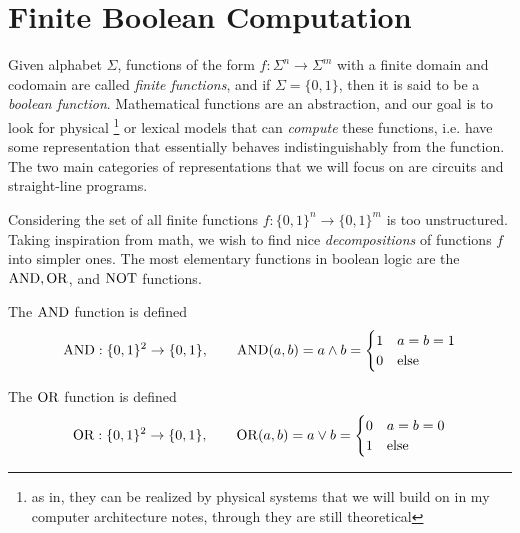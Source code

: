 \section{Finite Boolean Computation}

  Given alphabet $\Sigma$, functions of the form $f: \Sigma^n \to \Sigma^m$ with a finite domain and codomain are called \textit{finite functions}, and if $\Sigma = \{0, 1\}$, then it is said to be a \textit{boolean function}. Mathematical functions are an abstraction, and our goal is to look for physical \footnote{as in, they can be realized by physical systems that we will build on in my computer architecture notes, through they are still theoretical} or lexical models that can \textit{compute} these functions, i.e. have some representation that essentially behaves indistinguishably from the function. The two main categories of representations that we will focus on are circuits and straight-line programs. 

  \label{binary_motivation}
  Considering the set of all finite functions $f: \{0, 1\}^n \to \{0, 1\}^m$ is too unstructured. Taking inspiration from math, we wish to find nice \textit{decompositions} of functions $f$ into simpler ones. The most elementary functions in boolean logic are the $\operatorname{AND}, \operatorname{OR}$, and $\operatorname{NOT}$ functions.  

  \begin{definition}
    \label{def:and-function}
    The $\operatorname{AND}$ function is defined 
    \begin{equation}
      \operatorname{AND}: \{0,1\}^2 \to \{0,1\}, \qquad 
      \operatorname{AND} (a,b) = a \wedge b = \begin{cases}
        1 & a = b = 1 \\
        0 & \text{else}
      \end{cases}
    \end{equation}
  \end{definition}

  \begin{definition}[OR Function]
    \label{def:or-function}
    The $\operatorname{OR}$ function is defined 
    \begin{equation}
      \operatorname{OR}: \{0,1\}^2 \to \{0,1\}, \qquad 
      \operatorname{OR} (a,b) = a \vee b = \begin{cases}
        0 & a = b = 0 \\
        1 & \text{else}
      \end{cases}
    \end{equation}
  \end{definition}

